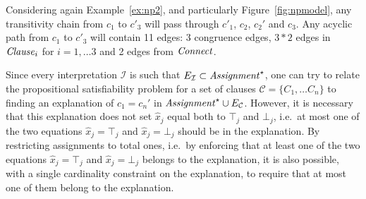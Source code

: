 \documentclass[smallextended]{svjour3}
\begin{document}
\noindent 
Considering again Example~\ref{ex:np2}, and particularly
Figure~\ref{fig:npmodel}, any transitivity chain from $c_1$ to
$c'_3$ will pass through $c'_1$, $c_2$, $c_2'$ and
$c_3$.  Any acyclic path from $c_1$ to $c'_3$ will contain 11
edges: 3 congruence edges, $3*2$ edges in ${\it Clause}_i$ for $i=1,\dots 3$
and 2 edges from ${\it Connect}$.

Since every interpretation $\mathcal{I}$ is such that $E_{\mathcal{I}} \subset
{\it Assignment}^\star$, one can try to relate the propositional satisfiability
problem for a set of clauses $\mathcal{C}= \{C_1, \dots C_n\}$ to finding an
explanation of $c_1 = c_n'$ in ${\it Assignment}^\star \cup
E_{\mathcal{C}}$.  However, it is necessary that this explanation does not set
$\hat{x}_j$ equal both to $\top_j$ and $\bot_j$, i.e.\ at most one of the two
equations $\hat{x}_j = \top_j$ and $\hat{x}_j = \bot_j$ should be in the
explanation.  By restricting assignments to total ones, i.e.\ by enforcing that
at least one of the two equations $\hat{x}_j = \top_j$ and $\hat{x}_j = \bot_j$
belongs to the explanation, it is also possible, with a single cardinality
constraint on the explanation, to require that at most one of them belong to the
explanation.
\end{document}
